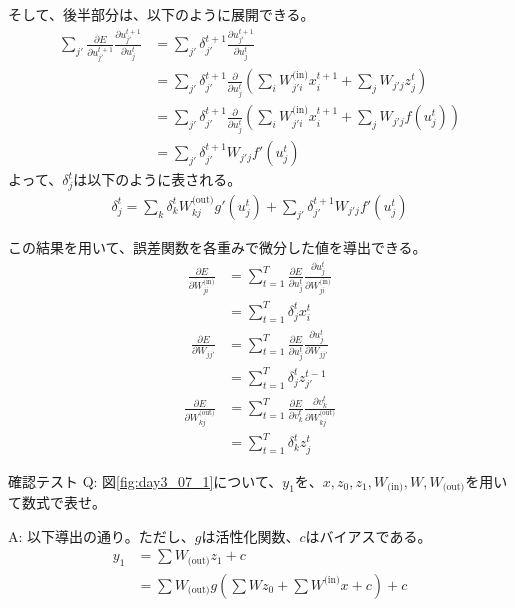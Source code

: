 \documentclass{ltjsarticle}
\begin{document}
そして、後半部分は、以下のように展開できる。
\begin{align}
  \sum_{j'} \frac{\partial E}{\partial u_{j'}^{t+1}} \frac{\partial u_{j'}^{t+1}}{\partial u_j^t} &= \sum_{j'} \delta_{j'}^{t+1} \frac{\partial u_{j'}^{t+1}}{\partial u_j^t}\\
  &= \sum_{j'} \delta_{j'}^{t+1} \frac{\partial}{\partial u_j^t} \left( \sum_i W_{j'i}^{\text{(in)}}x_i^{t+1} + \sum_{j} W_{j'j}z_{j}^t \right)\\
  &= \sum_{j'} \delta_{j'}^{t+1} \frac{\partial}{\partial u_j^t} \left( \sum_i W_{j'i}^{\text{(in)}}x_i^{t+1} + \sum_{j} W_{j'j}f(u_j^t) \right)\\
  &= \sum_{j'} \delta_{j'}^{t+1} W_{j'j} f'(u_j^t)
\end{align}
よって、$\delta_j^t$は以下のように表される。
\begin{align}
  \delta_j^t =  \sum_k \delta_k^t W_{kj}^{\text{(out)}} g'(u_j^t) + \sum_{j'} \delta_{j'}^{t+1} W_{j'j} f'(u_j^t)
\end{align}

この結果を用いて、誤差関数を各重みで微分した値を導出できる。
\begin{align}
  \frac{\partial E}{\partial W_{ji}^{\text{(in)}}} &= \sum_{t=1}^T \frac{\partial E}{\partial u_j^t} \frac{\partial u_j^t}{\partial W_{ji}^{\text{(in)}}}\\
  &= \sum_{t=1}^T \delta_j^t x_i^t
\end{align}
\begin{align}
  \frac{\partial E}{\partial W_{jj'}} &= \sum_{t=1}^T \frac{\partial E}{\partial u_j^t} \frac{\partial u_j^t}{\partial W_{jj'}}\\
  &= \sum_{t=1}^T \delta_j^t z_{j'}^{t-1}
\end{align}
\begin{align}
  \frac{\partial E}{\partial W_{kj}^{\text{(out)}}} &= \sum_{t=1}^T \frac{\partial E}{\partial v_k^t} \frac{\partial v_k^t}{\partial W_{kj}^{\text{(out)}}}\\
  &= \sum_{t=1}^T \delta_k^t z_j^t
\end{align}

\begin{itembox}[l]{確認テスト}
  Q: 図\ref{fig:day3_07_1}について、$y_1$を、$x, z_0, z_1, W_{\text{(in)}}, W, W_{\text{(out)}}$を用いて数式で表せ。

  A: 以下導出の通り。ただし、$g$は活性化関数、$c$はバイアスである。
  \begin{align}
    y_1 &= \sum W_{\text{(out)}}z_1 + c\\
    &= \sum W_{\text{(out)}}g(\sum Wz_0 + \sum W^{\text{(in)}}x + c) + c
  \end{align}
\end{itembox}
\end{document}
